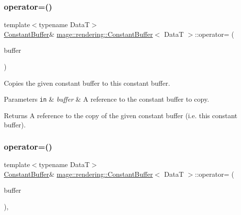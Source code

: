 \subsubsection{\texorpdfstring{operator=()}{operator=()}\hspace{0.1cm}{\footnotesize\ttfamily [1/2]}}
{\footnotesize\ttfamily template$<$typename DataT$>$ \\
\hyperlink{classmage_1_1rendering_1_1_constant_buffer}{Constant\+Buffer}\& \hyperlink{classmage_1_1rendering_1_1_constant_buffer}{mage\+::rendering\+::\+Constant\+Buffer}$<$ DataT $>$\+::operator= (\begin{DoxyParamCaption}\item[{const \hyperlink{classmage_1_1rendering_1_1_constant_buffer}{Constant\+Buffer}$<$ DataT $>$ \&}]{buffer }\end{DoxyParamCaption})\hspace{0.3cm}{\ttfamily [delete]}}

Copies the given constant buffer to this constant buffer.


\begin{DoxyParams}[1]{Parameters}
\mbox{\tt in}  & {\em buffer} & A reference to the constant buffer to copy. \\
\hline
\end{DoxyParams}
\begin{DoxyReturn}{Returns}
A reference to the copy of the given constant buffer (i.\+e. this constant buffer). 
\end{DoxyReturn}
\hypertarget{classmage_1_1rendering_1_1_constant_buffer_a25b1945f44cfbb7fd96bc146ca76adc7}{}\label{classmage_1_1rendering_1_1_constant_buffer_a25b1945f44cfbb7fd96bc146ca76adc7} 
\subsubsection{\texorpdfstring{operator=()}{operator=()}\hspace{0.1cm}{\footnotesize\ttfamily [2/2]}}
{\footnotesize\ttfamily template$<$typename DataT$>$ \\
\hyperlink{classmage_1_1rendering_1_1_constant_buffer}{Constant\+Buffer}\& \hyperlink{classmage_1_1rendering_1_1_constant_buffer}{mage\+::rendering\+::\+Constant\+Buffer}$<$ DataT $>$\+::operator= (\begin{DoxyParamCaption}\item[{\hyperlink{classmage_1_1rendering_1_1_constant_buffer}{Constant\+Buffer}$<$ DataT $>$ \&\&}]{buffer }\end{DoxyParamCaption})\hspace{0.3cm}{\ttfamily [default]}, {\ttfamily [noexcept]}}

